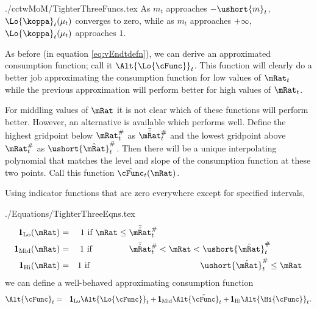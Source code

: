 \documentclass[titlepage]{\econtex}
\begin{document}
\begin{verbatimwrite}{./cctwMoM/TighterThreeFuncs.tex}
  As $m_{t}$ approaches
  $-\ushort{m}_{t}$, $\Lo{\koppa}_{t}(\mu_{t})$ converges to zero, while as $m_{t}$
  approaches $+\infty$, $\Lo{\koppa}_{t}(\mu_{t})$ approaches $1$.  

  As before (in equation \eqref{eq:vEndtdefn}), we can derive an approximated consumption function; call it
  $\Alt{\Lo{\cFunc}}_{t}$.  This function will clearly do a better job approximating the consumption
  function for low values of $\mRat_{t}$ while the previous approximation will perform better
  for high values of $\mRat_{t}$.  

  For middling values of $\mRat$ it is not clear which of these
  functions will perform better.  However, an alternative is available
  which performs well.  Define the highest gridpoint below $\mtCusp$ as
  $\bar{\check{\mRat}}_{t}^{\#}$ and the lowest gridpoint above $\mtCusp$ as
  $\ushort{\hat{\mRat}}_{t}^{\#}$.  Then there will be a unique interpolating
  polynomial that matches the level and slope of the consumption function
  at these two points.  Call this function $\tilde{\cFunc}_{t}(\mRat)$.  

  Using indicator functions that are zero everywhere except for specified intervals,
\end{verbatimwrite}

\begin{verbatimwrite}{./Equations/TighterThreeEqns.tex}
  \begin{eqnarray*}
    \pmb{1}_{\text{Lo}}(\mRat) & = & 1 \text{~if $          \mRat \leq  \bar{\check{\mRat}}_{t}^{\#} \phantom{< \mRat <   \ushort{\hat{\mRat}}_{t}^{\#}          \leq \mRat}$}
    \\  \pmb{1}_{\text{Mid}}(\mRat) & = & 1 \text{~if $\phantom{ \mRat \leq}~ \bar{\check{\mRat}}_{t}^{\#}          < \mRat <   \ushort{\hat{\mRat}}_{t}^{\#} \phantom{\leq \mRat}$}
    \\  \pmb{1}_{\text{Hi}}(\mRat) & = & 1 \text{~if $\phantom{ \mRat \leq  ~\bar{\check{\mRat}}_{t}^{\#}          < \mRat < } \ushort{\hat{\mRat}}_{t}^{\#}           \leq \mRat$}
  \end{eqnarray*}
  we can define a well-behaved approximating consumption function
  \begin{eqnarray}
    \Alt{\cFunc}_{t} & = & \pmb{1}_{\text{Lo}} \Alt{\Lo{\cFunc}}_{t} + \pmb{1}_{\text{Mid}} \Alt{\tilde{\cFunc}}_{t}+\pmb{1}_{\text{Hi}} \Alt{\Hi{\cFunc}}_{t}.
  \end{eqnarray}
\end{verbatimwrite}

\end{document}
